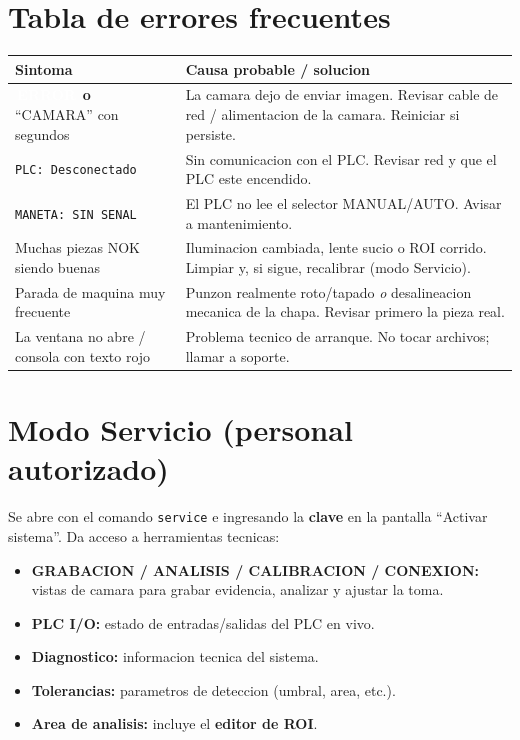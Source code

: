 \documentclass[11pt,a4paper]{article}
\newcommand{\estado}[2]{\colorbox{#1}{\textcolor{white}{\small\,\textbf{#2}\,}}}
\begin{document}
\section{Tabla de errores frecuentes}\label{sec:errores}
\begin{center}
\renewcommand{\arraystretch}{1.45}
\begin{tabular}{>{\raggedright\arraybackslash}p{4.8cm} >{\raggedright\arraybackslash}p{10cm}}
\toprule
\textbf{Sintoma} & \textbf{Causa probable / solucion}\\
\midrule
\estado{ink}{ERROR} \textbf{o} ``CAMARA'' con segundos & La camara dejo de
  enviar imagen. Revisar cable de red / alimentacion de la camara. Reiniciar
  si persiste.\\
\texttt{PLC: Desconectado} & Sin comunicacion con el PLC. Revisar red y que
  el PLC este encendido.\\
\texttt{MANETA: SIN SENAL} & El PLC no lee el selector MANUAL/AUTO. Avisar a
  mantenimiento.\\
Muchas piezas NOK siendo buenas & Iluminacion cambiada, lente sucio o ROI
  corrido. Limpiar y, si sigue, recalibrar (modo Servicio).\\
Parada de maquina muy frecuente & Punzon realmente roto/tapado \emph{o}
  desalineacion mecanica de la chapa. Revisar primero la pieza real.\\
La ventana no abre / consola con texto rojo & Problema tecnico de arranque.
  No tocar archivos; llamar a soporte.\\
\bottomrule
\end{tabular}
\end{center}

\section{Modo Servicio (personal autorizado)}
Se abre con el comando \texttt{service} e ingresando la \textbf{clave} en la
pantalla ``Activar sistema''. Da acceso a herramientas tecnicas:

\begin{itemize}[leftmargin=1.4em]
  \item \textbf{GRABACION / ANALISIS / CALIBRACION / CONEXION:} vistas de
        camara para grabar evidencia, analizar y ajustar la toma.
  \item \textbf{PLC I/O:} estado de entradas/salidas del PLC en vivo.
  \item \textbf{Diagnostico:} informacion tecnica del sistema.
  \item \textbf{Tolerancias:} parametros de deteccion (umbral, area, etc.).
  \item \textbf{Area de analisis:} incluye el \textbf{editor de ROI}.
\end{itemize}
\end{document}

